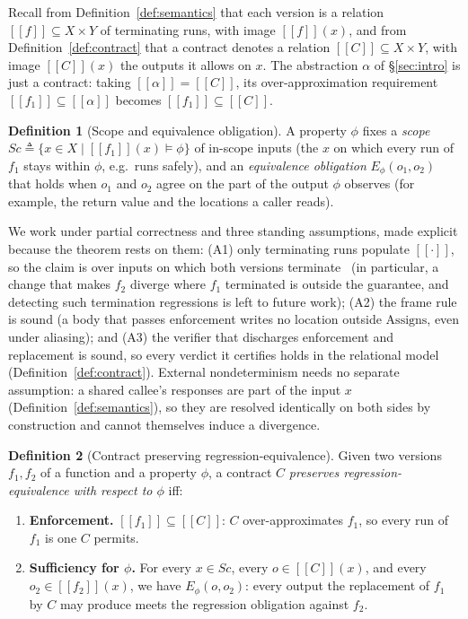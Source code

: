 \documentclass[conference]{IEEEtran}
\theoremstyle{definition}
\newtheorem{definition}{Definition}
\theoremstyle{remark}
\newcommand{\sem}[1]{[\![#1]\!]}
\begin{document}
Recall from Definition~\ref{def:semantics} that each version is a
relation $\sem{f}\subseteq X\times Y$ of terminating runs, with image
$\sem{f}(x)$, and from Definition~\ref{def:contract} that a contract
denotes a relation $\sem{C}\subseteq X\times Y$, with image $\sem{C}(x)$
the outputs it allows on $x$. The abstraction $\alpha$ of
\S\ref{sec:intro}
is just a contract: taking $\sem{\alpha}=\sem{C}$, its
over-approximation requirement $\sem{f_1}\subseteq\sem{\alpha}$ becomes
$\sem{f_1}\subseteq\sem{C}$.

\begin{definition}[Scope and equivalence obligation]\label{def:scope}
  A property $\phi$ fixes a \emph{scope}
  $\mathit{Sc}\triangleq\{x\in X\mid\sem{f_1}(x)\models\phi\}$ of
  in-scope inputs (the $x$ on which every run of $f_1$ stays within
  $\phi$, e.g.\ runs safely), and an \emph{equivalence obligation}
  $E_\phi(o_1,o_2)$ that holds when $o_1$ and $o_2$ agree on the part of
  the output $\phi$ observes (for example, the return value and the
  locations a caller reads).
\end{definition}
We work under partial correctness and three standing assumptions, made
explicit because the theorem rests on them: (A1) only terminating runs
populate $\sem{\cdot}$, so the claim is over inputs on which both
versions terminate~\cite{godlin2013rv} (in particular, a change that
  makes $f_2$ diverge where $f_1$ terminated is outside the guarantee, and
detecting such termination regressions is left to future work); (A2) the
frame rule is
sound (a body that passes enforcement writes no location outside
$\text{Assigns}$, even under aliasing); and
(A3) the verifier that
discharges enforcement and replacement is sound, so every verdict it
certifies holds in the relational model (Definition~\ref{def:contract}).
External nondeterminism
needs no separate assumption: a shared callee's responses are part of
the input $x$ (Definition~\ref{def:semantics}), so they are resolved
identically on both sides by construction and cannot themselves induce a
divergence.

\begin{definition}[Contract preserving
  regression-equivalence]\label{def:preserves}
  Given two versions $f_1, f_2$ of a function and a property $\phi$, a
  contract $C$ \emph{preserves regression-equivalence with respect to
  $\phi$} iff:
  \begin{enumerate}
    \item \textbf{Enforcement.} $\sem{f_1}\subseteq\sem{C}$: $C$
      over-approximates $f_1$, so every run of $f_1$ is one $C$ permits.
    \item \textbf{Sufficiency for $\phi$.} For every $x\in\mathit{Sc}$,
      every $o\in\sem{C}(x)$, and every $o_2\in\sem{f_2}(x)$, we have
      $E_\phi(o,o_2)$: every output the replacement of $f_1$ by $C$ may
      produce meets the regression obligation against $f_2$.
  \end{enumerate}
\end{definition}
\end{document}
